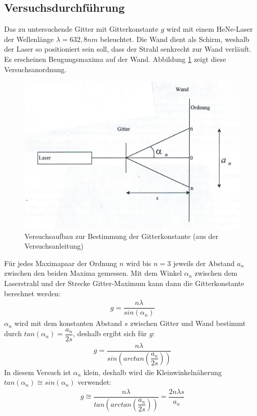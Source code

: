 \documentclass{scrartcl}
\begin{document}
\subsection{Versuchsdurchführung}
Das zu untersuchende Gitter mit Gitterkonstante $g$ wird mit einem HeNe-Laser der Wellenlänge $\lambda = 632,8nm$ beleuchtet. Die Wand dient als Schirm, weshalb der Laser so positioniert sein soll, dass der Strahl senkrecht zur Wand verläuft. Es erscheinen Beugungsmaxima auf der Wand. Abbildung \ref{fig:Gitter} zeigt diese Versuchsanordnung.
\begin{figure}[H]
  \centering
    \includegraphics[scale=0.75]{BeugungGitter.png}
  \caption{Versuchsaufbau zur Bestimmung der Gitterkonstante (aus der Versuchsanleitung)}
  \label{fig:Gitter}
\end{figure}
Für jedes Maximapaar der Ordnung $n$ wird bis $n = 3$ jeweils der Abstand $a_{n}$ zwischen den beiden Maxima gemessen. Mit dem Winkel $\alpha_{n}$ zwischen dem Laserstrahl und der Strecke Gitter-Maximum kann dann die Gitterkonstante berechnet werden:
\begin{align}
g = \dfrac{n \lambda}{sin \left( \alpha_{n} \right) }
\end{align}
$\alpha_{n}$ wird mit dem konstanten Abstand $s$ zwischen Gitter und Wand bestimmt durch $tan (\alpha_{n}) = \dfrac{a_{n}}{2s}$, deshalb ergibt sich für $g$:
\begin{align}
g = \dfrac{n \lambda}{sin \left( arctan \left( \dfrac{a_{n}}{2s} \right) \right) }
\label{eq:Gitter1}
\end{align}
In diesem Versuch ist $\alpha_{n}$ klein, deshalb wird die Kleinwinkelnäherung $tan (\alpha_{n}) \cong sin (\alpha_{n})$ verwendet:
\begin{align}
g \cong \dfrac{n \lambda}{tan \left( arctan \left( \dfrac{a_{n}}{2s} \right) \right) } = \dfrac{2n \lambda s}{a_{n}}
\label{eq:Gitter2}
\end{align}
\end{document}
